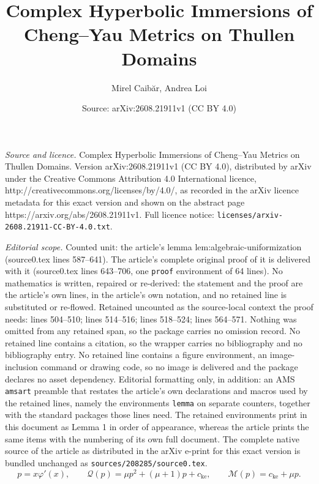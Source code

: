 \documentclass[10pt,a4paper]{amsart}
\title{Complex Hyperbolic Immersions of Cheng--Yau Metrics on Thullen Domains}
\author{Mirel Caib{\u a}r, Andrea Loi}
\date{Source: arXiv:2608.21911v1 (CC BY 4.0)}
\begin{document}
\maketitle

\noindent\emph{Source and licence.} Complex Hyperbolic Immersions of Cheng--Yau Metrics on Thullen Domains. Version arXiv:2608.21911v1 (CC BY 4.0), distributed by arXiv under the Creative Commons Attribution 4.0 International licence, http://creativecommons.org/licenses/by/4.0/, as recorded in the arXiv licence metadata for this exact version and shown on the abstract page https://arxiv.org/abs/2608.21911v1. Full licence notice: \texttt{licenses/arxiv-2608.21911-CC-BY-4.0.txt}.\par\smallskip

\noindent\textit{Editorial scope.} Counted unit: the article's lemma lem:algebraic-uniformization (source0.tex lines 587--641). The article's complete original proof of it is delivered with it (source0.tex lines 643--706, one \texttt{proof} environment of 64 lines). No mathematics is written, repaired or re-derived: the statement and the proof are the article's own lines, in the article's own notation, and no retained line is substituted or re-flowed.  Retained uncounted as the source-local context the proof needs: lines 504--510; lines 514--516; lines 518--524; lines 564--571.  Nothing was omitted from any retained span, so the package carries no omission record.  No retained line contains a citation, so the wrapper carries no bibliography and no bibliography entry.  No retained line contains a figure environment, an image-inclusion command or drawing code, so no image is delivered and the package declares no asset dependency.  Editorial formatting only, in addition: an AMS \texttt{amsart} preamble that restates the article's own declarations and macros used by the retained lines, namely the environments \texttt{lemma} on separate counters, together with the standard packages those lines need.  The retained environments print in this document as Lemma 1 in order of appearance, whereas the article prints the same items with the numbering of its own full document.  The complete native source of the article as distributed in the arXiv e-print for this exact version is bundled unchanged as \texttt{sources/208285/source0.tex}.
\begin{equation}\label{eq:PQM}
 p=x\varphi'(x),
 \qquad
 \mathcal Q(p)=\mu p^2+(\mu+1)p+c_{\mathrm{ke}},
 \qquad
 \mathcal M(p)=c_{\mathrm{ke}}+\mu p.
\end{equation}
\end{document}
